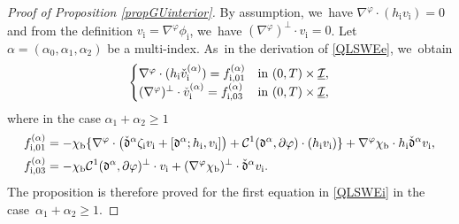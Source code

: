 \documentclass[JEP,XML,SOM,Unicode,NoFloatCountersInSection,published]{cedram}
\newcommand{\cI}{{\mathcal I}}
\newcommand{\ul}[1]{\underline{#1}}
\newcommand{\cmfalpha}{\check{\mathfrak{d}}^{\alpha}}
\theoremstyle{definition}
\begin{document}
\begin{proof}[Proof of Proposition \ref{propGUinterior}]
By assumption, we~have $\nabla^{\varphi}\cdot(h_\mathrm{i}v_\mathrm{i})=0$ and from the definition $v_\mathrm{i}=\nabla^\varphi \phi_\mathrm{i}$, we~have $(\nabla^\varphi)^\perp\cdot v_\mathrm{i}=0$.
Let $\alpha=(\alpha_0,\alpha_1,\alpha_2)$ be a multi-index. As~in the derivation of \eqref{QLSWEe}, we~obtain
\begin{equation}\label{preQLSWEi0}
\begin{cases}
\nabla^\varphi\cdot(h_\mathrm{i}\check{v}_\mathrm{i}^{(\alpha)}) = f_{{\rm i},01}^{(\alpha)} &\text{in } (0,T)\times\ul{\cI}, \\
(\nabla^\varphi)^\perp\cdot\check{v}_\mathrm{i}^{(\alpha)} = f_{{\rm i},03}^{(\alpha)} &\text{in } (0,T)\times\ul{\cI},
\end{cases}
\end{equation}
where in the case $\alpha_1+\alpha_2\geq1$
\begin{align}
\label{deffi01}
f_{{\rm i},01}^{(\alpha)}
&= -\chi_\mathrm{b}\{ \nabla^\varphi\cdot\bigl(\cmfalpha\zeta_\mathrm{i} v_\mathrm{i}
+ [\mathfrak{d}^\alpha;h_\mathrm{i},v_\mathrm{i}] \bigr)
+ {\mathcal C}^1(\mathfrak{d}^\alpha,\partial\varphi)\cdot(h_\mathrm{i}v_\mathrm{i}) \}
+ \nabla^\varphi\chi_\mathrm{b}\cdot h_\mathrm{i} \cmfalpha v_\mathrm{i} , \\
\label{deffi03}
f_{{\rm i},03}^{(\alpha)}
&= -\chi_\mathrm{b} {\mathcal C}^1(\mathfrak{d}^\alpha,\partial\varphi)^\perp\cdot v_\mathrm{i}
+ (\nabla^\varphi\chi_\mathrm{b})^\perp\cdot \cmfalpha v_\mathrm{i}.
\end{align}
The proposition is therefore proved for the first equation in \eqref{QLSWEi} in the case~\hbox{$\alpha_1\!+\!\alpha_2\!\geq\! 1$}.


\end{proof}
\end{document}
